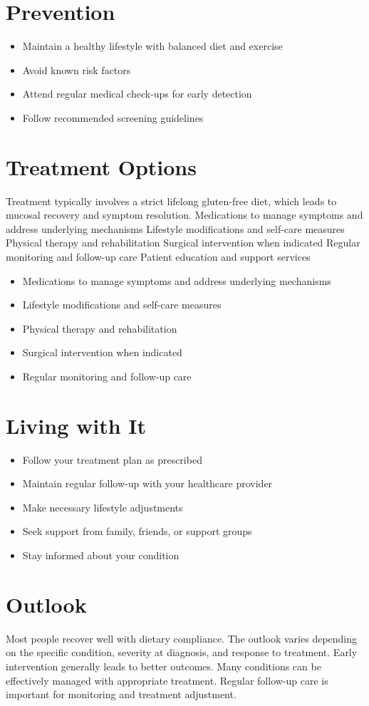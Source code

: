 \section{Prevention}
\begin{itemize}[noitemsep]
  \item Maintain a healthy lifestyle with balanced diet and exercise
  \item Avoid known risk factors
  \item Attend regular medical check-ups for early detection
  \item Follow recommended screening guidelines
\end{itemize}
\section{Treatment Options}
Treatment typically involves a strict lifelong gluten-free diet, which leads to mucosal recovery and symptom resolution. Medications to manage symptoms and address underlying mechanisms Lifestyle modifications and self-care measures Physical therapy and rehabilitation Surgical intervention when indicated Regular monitoring and follow-up care Patient education and support services

\begin{itemize}[noitemsep]
  \item Medications to manage symptoms and address underlying mechanisms
  \item Lifestyle modifications and self-care measures
  \item Physical therapy and rehabilitation
  \item Surgical intervention when indicated
  \item Regular monitoring and follow-up care
\end{itemize}
\section{Living with It}
\begin{itemize}[noitemsep]
  \item Follow your treatment plan as prescribed
  \item Maintain regular follow-up with your healthcare provider
  \item Make necessary lifestyle adjustments
  \item Seek support from family, friends, or support groups
  \item Stay informed about your condition
\end{itemize}
\section{Outlook}
Most people recover well with dietary compliance. The outlook varies depending on the specific condition, severity at diagnosis, and response to treatment. Early intervention generally leads to better outcomes. Many conditions can be effectively managed with appropriate treatment. Regular follow-up care is important for monitoring and treatment adjustment.
